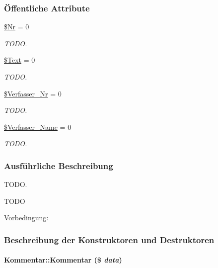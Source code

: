 \subsubsection*{\"{O}ffentliche Attribute}
\begin{CompactItemize}
\item 
\hyperlink{classKommentar_1b0a3cfcb9fc7075f985cc8067ab1982}{\$Nr} = 0
\begin{CompactList}\small\item\em TODO. \item\end{CompactList}\item 
\hyperlink{classKommentar_c9a481413d6ba0c000719ad514bad4b5}{\$Text} = 0
\begin{CompactList}\small\item\em TODO. \item\end{CompactList}\item 
\hyperlink{classKommentar_c92b002e40690ee052fec446ff2a0ef6}{\$Verfasser\_\-Nr} = 0
\begin{CompactList}\small\item\em TODO. \item\end{CompactList}\item 
\hyperlink{classKommentar_84f0fc10295968adde28169f8df018d9}{\$Verfasser\_\-Name} = 0
\begin{CompactList}\small\item\em TODO. \item\end{CompactList}\end{CompactItemize}


\subsubsection{Ausf\"{u}hrliche Beschreibung}
TODO. 

TODO \begin{Desc}
\item[Vorbedingung:]\end{Desc}




\subsubsection{Beschreibung der Konstruktoren und Destruktoren}
\hypertarget{classKommentar_ea774e2108c754890c602dfdd53d64e1}{
\paragraph[Kommentar]{\setlength{\rightskip}{0pt plus 5cm}Kommentar::Kommentar (\$ {\em data})}\hfill}
\label{classKommentar_ea774e2108c754890c602dfdd53d64e1}


